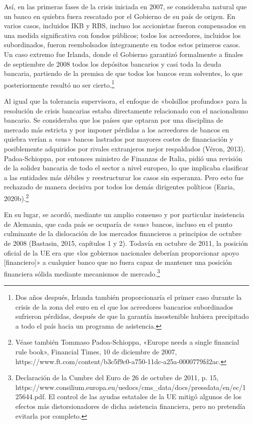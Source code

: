 \documentclass[10pt,a4paper]{article}
\begin{document}
{Así, en las primeras fases de la crisis iniciada en 2007, se consideraba natural que un banco en quiebra fuera rescatado por el Gobierno de su país de origen. En varios casos, incluidos IKB y RBS, incluso los accionistas fueron compensados en una medida significativa con fondos públicos; todos los acreedores, incluidos los subordinados, fueron reembolsados íntegramente en todos estos primeros casos. Un caso extremo fue Irlanda, donde el Gobierno garantizó formalmente a finales de septiembre de 2008 todos los depósitos bancarios y casi toda la deuda bancaria, partiendo de la premisa de que todos los bancos eran solventes, lo que posteriormente resultó no ser cierto.\footnote{%
    Dos años después, Irlanda también proporcionaría el primer caso durante la crisis de la zona del euro en el que los acreedores bancarios subordinados sufrieron pérdidas, después de que la garantía insostenible hubiera precipitado a todo el país hacia un programa de asistencia.
}

Al igual que la tolerancia supervisora, el enfoque de «bolsillos profundos» para la resolución de crisis bancarias estaba directamente relacionado con el nacionalismo bancario. Se consideraba que los países que optaran por una disciplina de mercado más estricta y por imponer pérdidas a los acreedores de bancos en quiebra verían a «sus» bancos lastrados por mayores costes de financiación y posiblemente adquiridos por rivales extranjeros mejor respaldados (Véron, 2013). Padoa-Schioppa, por entonces ministro de Finanzas de Italia, pidió una revisión de la solidez bancaria de todo el sector a nivel europeo, lo que implicaba clasificar a las entidades más débiles y reestructurar los casos sin esperanza. Pero esto fue rechazado de manera decisiva por todos los demás dirigentes políticos (Enria, 2020b).\footnote{%
    Véase también Tommaso Padoa-Schioppa, «Europe needs a single financial rule book», Financial Times, 10 de diciembre de 2007, https://www.ft.com/content/b3c5f9c0-a750-11dc-a25a-0000779fd2ac.
}

En su lugar, se acordó, mediante un amplio consenso y por particular insistencia de Alemania, que cada país se ocuparía de «sus» bancos, incluso en el punto culminante de la dislocación de los mercados financieros a principios de octubre de 2008 (Bastasin, 2015, capítulos 1 y 2). Todavía en octubre de 2011, la posición oficial de la UE era que «los gobiernos nacionales deberían proporcionar apoyo [financiero]» a cualquier banco que no fuera capaz de mantener una posición financiera sólida mediante mecanismos de mercado.\footnote{%
    Declaración de la Cumbre del Euro de 26 de octubre de 2011, p. 15, https://www.consilium.europa.eu/uedocs/cms_data/docs/pressdata/en/ec/125644.pdf. El control de las ayudas estatales de la UE mitigó algunos de los efectos más distorsionadores de dicha asistencia financiera, pero no pretendía evitarla por completo.
}

}
\end{document}
